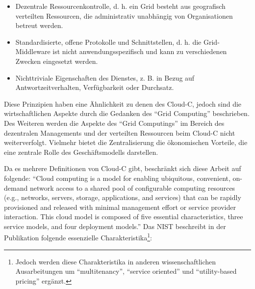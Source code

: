 \begin{itemize}
	\item Dezentrale Ressourcenkontrolle, d. h. ein Grid besteht aus geografisch verteilten Ressourcen, die administrativ unabhängig von Organisationen betreut werden.	
	\item Standardisierte, offene Protokolle und Schnittstellen, d. h. die Grid-Middleware
	ist nicht anwendungsspezifisch und kann zu verschiedenen Zwecken eingesetzt
	werden.
	\item Nichttriviale Eigenschaften des Dienstes, z. B. in Bezug auf Antwortzeitverhalten, Verfügbarkeit oder Durchsatz.
\end{itemize}
Diese Prinzipien haben eine Ähnlichkeit zu denen des \ac{Cloud-C}, jedoch sind die wirtschaftlichen Aspekte durch die Gedanken des \enquote{Grid Computing} beschrieben. Des Weiteren werden die Aspekte des \enquote{Grid Computings} im Bereich des dezentralen Managements und der verteilten Ressourcen beim \ac{Cloud-C} nicht weiterverfolgt. Vielmehr bietet die Zentralisierung die ökonomischen Vorteile, die eine zentrale Rolle des Geschäftsmodells darstellen. \par
Da es mehrere Definitionen von \ac{Cloud-C} gibt, beschränkt sich diese Arbeit auf folgende: \enquote{Cloud computing is a model for enabling ubiquitous, convenient, on-demand network access to a shared pool of configurable computing resources (e.g., networks, servers, storage, applications, and services) that can be rapidly provisioned and released with minimal management effort or service provider interaction. This cloud model is composed of five essential characteristics, three service models, and four deployment models.}\autocite[][S.2]{mell_nist_2011} Das \ac{NIST} beschreibt in der Publikation \cite{mell_nist_2011} folgende essenzielle Charakteristika\footnote{Jedoch werden diese Charakteristika in anderen wissenschaftlichen Ausarbeitungen um \enquote{multitenancy}, \enquote{service oriented} und \enquote{utility-based pricing} ergänzt.\autocite[vgl.][S.1]{institute_of_electrical_and_electronics_engineers_cloud_2011}}: 

